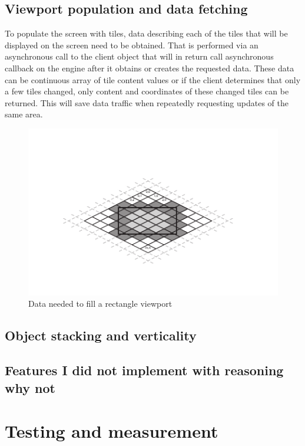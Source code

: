 \documentclass[11pt,oneside, final]{fithesis2}
\begin{document}
\section{Viewport population and data fetching}
To populate the screen with tiles, data describing each of the tiles that will be displayed on the screen need to be obtained. That is performed via an asynchronous call to the client object that will in return call asynchronous callback on the engine after it obtains or creates the requested data. These data can be continuous array of tile content values or if the client determines that only a few tiles changed, only content and coordinates of these changed tiles can be returned. This will save data traffic when repeatedly requesting updates of the same area.

\begin{figure}[htp]
	\centering
	\includegraphics[clip=true,trim=20mm 17mm 20mm 23mm]{thesis-isodata}
	\caption{Data needed to fill a rectangle viewport}
	\label{isodata}
\end{figure}

\section{Object stacking and verticality}

\section{Features I did not implement with reasoning why not}

\chapter{Testing and measurement}
\label{testing}
\end{document}
